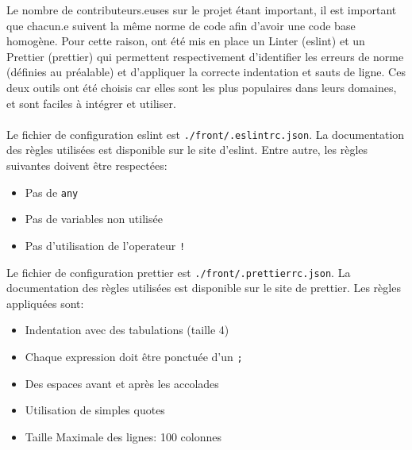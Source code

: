 Le nombre de contributeurs.euses sur le projet étant important, il est important que chacun.e suivent la même norme de code afin d’avoir une code base homogène.
Pour cette raison, ont été mis en place un Linter (eslint) et un Prettier (prettier) qui permettent respectivement d'identifier les erreurs de norme (définies au préalable) et d’appliquer la correcte indentation et sauts de ligne.
Ces deux outils ont été choisis car elles sont les plus populaires dans leurs domaines, et sont faciles à intégrer et utiliser.
\\\\
Le fichier de configuration eslint est \verb|./front/.eslintrc.json|. La documentation des règles utilisées est disponible sur le site d’eslint.
Entre autre, les règles suivantes doivent être respectées:

\begin{itemize}
	\item Pas de \verb|any|
	\item Pas de variables non utilisée
	\item Pas d'utilisation de l'operateur \verb|!|
\end{itemize}

Le fichier de configuration prettier est \verb|./front/.prettierrc.json|. La documentation des règles utilisées est disponible sur le site de prettier.
Les règles appliquées sont:
\begin{itemize}
	\item Indentation avec des tabulations (taille 4)
	\item Chaque expression doit être ponctuée d'un \verb|;|
	\item Des espaces avant et après les accolades
	\item Utilisation de simples quotes
	\item Taille Maximale des lignes: 100 colonnes
\end{itemize}